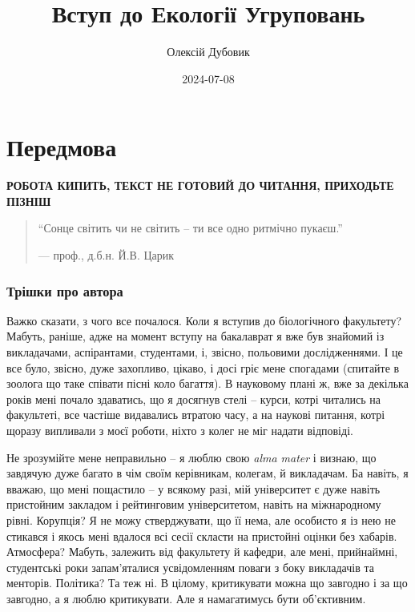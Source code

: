 \documentclass[
  11pt,
]{book}
\title{Вступ до Екології Угруповань}
\author{Олексій Дубовик}
\date{2024-07-08}
\begin{document}
\maketitle

{
\setcounter{tocdepth}{1}
\tableofcontents
}
\chapter*{Передмова}\label{ux43fux435ux440ux435ux434ux43cux43eux432ux430}

\textbf{{РОБОТА КИПИТЬ, ТЕКСТ НЕ ГОТОВИЙ ДО ЧИТАННЯ, ПРИХОДЬТЕ ПІЗНІШ}}

\begin{quote}
``Сонце світить чи не світить --
ти все одно ритмічно пукаєш.''

--- проф., д.б.н. Й.В. Царик
\end{quote}

\subsection{Трішки про автора}\label{about-author}

Важко сказати, з чого все почалося. Коли я вступив до біологічного факультету? Мабуть, раніше, адже на момент вступу на бакалаврат я вже був знайомий із викладачами, аспірантами, студентами, і, звісно, польовими дослідженнями. І це все було, звісно, дуже захопливо, цікаво, і досі гріє мене спогадами (спитайте в зоолога що таке співати пісні коло багаття). В науковому плані ж, вже за декілька років мені почало здаватись, що я досягнув стелі -- курси, котрі читались на факультеті, все частіше видавались втратою часу, а на наукові питання, котрі щоразу випливали з моєї роботи, ніхто з колег не міг надати відповіді.

Не зрозумійте мене неправильно -- я люблю свою \emph{alma mater} і визнаю, що завдячую дуже багато в чім своїм керівникам, колегам, й викладачам. Ба навіть, я вважаю, що мені пощастило -- у всякому разі, мій університет є дуже навіть пристойним закладом і рейтинговим університетом, навіть на міжнародному рівні. Корупція? Я не можу стверджувати, що її нема, але особисто я із нею не стикався і якось мені вдалося всі сесії скласти на пристойні оцінки без хабарів. Атмосфера? Мабуть, залежить від факультету й кафедри, але мені, прийнаймні, студентські роки запам'яталися усвідомленням поваги з боку викладачів та менторів. Політика? Та теж ні. В цілому, критикувати можна що завгодно і за що завгодно, а я люблю критикувати. Але я намагатимусь бути об'єктивним.
\end{document}
